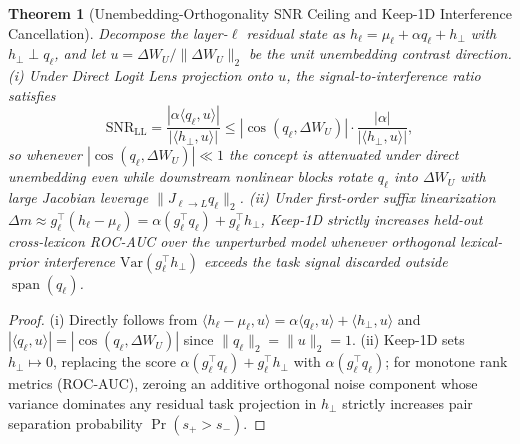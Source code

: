 \documentclass[10pt]{article}
\newtheorem{theorem}{Theorem}
\begin{document}
\begin{theorem}[Unembedding-Orthogonality SNR Ceiling and Keep-1D Interference Cancellation]
Decompose the layer-$\ell$ residual state as $h_\ell = \mu_\ell + \alpha q_\ell + h_\perp$ with $h_\perp \perp q_\ell$, and let $u = \Delta W_U / \|\Delta W_U\|_2$ be the unit unembedding contrast direction.
(i) Under Direct Logit Lens projection onto $u$, the signal-to-interference ratio satisfies
\begin{equation}
  \mathrm{SNR}_{\mathrm{LL}} = \frac{|\alpha \langle q_\ell, u\rangle|}{|\langle h_\perp, u\rangle|} \le |\cos(q_\ell, \Delta W_U)| \cdot \frac{|\alpha|}{|\langle h_\perp, u\rangle|},
\end{equation}
so whenever $|\cos(q_\ell, \Delta W_U)| \ll 1$ the concept is attenuated under direct unembedding even while downstream nonlinear blocks rotate $q_\ell$ into $\Delta W_U$ with large Jacobian leverage $\|J_{\ell \to L} q_\ell\|_2$.
(ii) Under first-order suffix linearization $\Delta m \approx g_\ell^\top (h_\ell - \mu_\ell) = \alpha(g_\ell^\top q_\ell) + g_\ell^\top h_\perp$, Keep-1D strictly increases held-out cross-lexicon ROC-AUC over the unperturbed model whenever orthogonal lexical-prior interference $\mathrm{Var}(g_\ell^\top h_\perp)$ exceeds the task signal discarded outside $\operatorname{span}(q_\ell)$.
\end{theorem}
\begin{proof}
(i) Directly follows from $\langle h_\ell - \mu_\ell, u\rangle = \alpha \langle q_\ell, u\rangle + \langle h_\perp, u\rangle$ and $|\langle q_\ell, u\rangle| = |\cos(q_\ell, \Delta W_U)|$ since $\|q_\ell\|_2 = \|u\|_2 = 1$.
(ii) Keep-1D sets $h_\perp \mapsto 0$, replacing the score $\alpha(g_\ell^\top q_\ell) + g_\ell^\top h_\perp$ with $\alpha(g_\ell^\top q_\ell)$; for monotone rank metrics (ROC-AUC), zeroing an additive orthogonal noise component whose variance dominates any residual task projection in $h_\perp$ strictly increases pair separation probability $\Pr(s_+ > s_-)$.
\end{proof}
\end{document}
